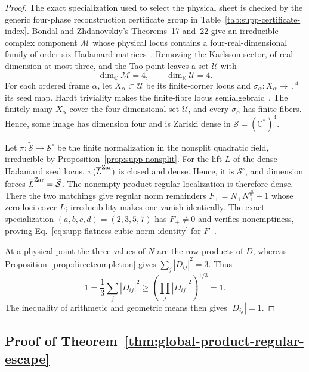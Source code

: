\documentclass[aps,prx,reprint,nofootinbib,twoside,superscriptaddress,longbibliography,floatfix]{revtex4-2}
\theoremstyle{definition}
\newcommand{\T}{\mathbb T}
\newcommand{\C}{\mathbb C}
\newcommand{\R}{\mathbb R}
\begin{document}
\begin{proof}
The exact specialization used to select the physical sheet is checked by the generic four-phase reconstruction certificate group in Table~\ref{tab:supp-certificate-index}.
{Bondal and Zhdanovskiy's Theorems~17 and~22 give an irreducible complex component $\mathcal M$ whose physical locus contains a four-real-dimensional family of order-six Hadamard matrices~\MainCiteBondal. Removing the Karlsson sector, of real dimension at most three, and the Tao point leaves a set $\mathcal U$ with}
\begin{equation}
{\dim_{\C}\mathcal M=4,
\qquad
\dim_{\R}\mathcal U=4.}
\label{eq:supp-flatness-dimensions}
\end{equation}
{For each ordered frame $\alpha$, let $X_\alpha\subset\mathcal U$ be its finite-corner locus and $\sigma_\alpha:X_\alpha\to\T^4$ its seed map.  Hardt triviality makes the finite-fibre locus semialgebraic~\MainCiteBasu. The finitely many $X_\alpha$ cover the four-dimensional set $\mathcal U$, and every $\sigma_\alpha$ has finite fibers. Hence, some image has dimension four and is Zariski dense in $\mathcal S=(\mathbb C^*)^4$.}

{Let $\pi:\widetilde{\mathcal S}\to\mathcal S^\circ$ be the finite normalization in the nonsplit quadratic field, irreducible by Proposition~\ref{prop:supp-nonsplit}. For the lift $L$ of the dense Hadamard seed locus, $\pi(\overline L^{\rm Zar})$ is closed and dense. Hence, it is $\mathcal S^\circ$, and dimension forces $\overline L^{\rm Zar}=\widetilde{\mathcal S}$. The nonempty product-regular localization is therefore dense. There the two matchings give regular norm remainders $F_\pm=N_\pm N_\pm^\#-1$ whose zero loci cover $L$; irreducibility makes one vanish identically. The exact specialization $(a,b,c,d)=(2,3,5,7)$ has $F_+\ne0$ and verifies nonemptiness, proving Eq.~\eqref{eq:supp-flatness-cubic-norm-identity} for $F_-$.}

{At a physical point the three values of $N$ are the row products of $D$, whereas Proposition~\ref{prop:directcompletion} gives $\sum_j|D_{ij}|^2=3$.  Thus}
\begin{equation}
{1=\frac13\sum_j|D_{ij}|^2\ge
\left(\prod_j|D_{ij}|^2\right)^{1/3}=1.}
\end{equation}
{The inequality of arithmetic and geometric means then gives $|D_{ij}|=1$.}
\end{proof}

\subsection{{Proof of Theorem~\ref{thm:global-product-regular-escape}}}
\label{sec:supp-product-escape}
\end{document}

